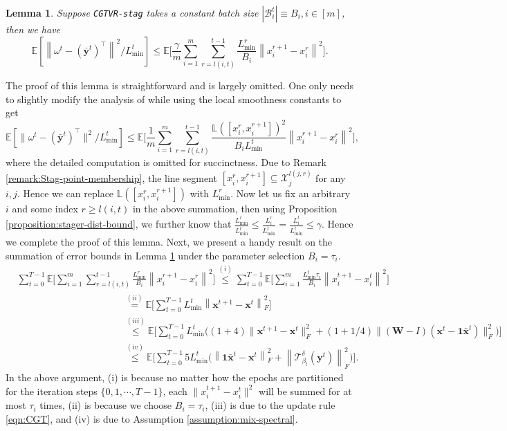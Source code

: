 \documentclass{article}
\newtheorem{lemma}[theorem]{Lemma}
\newcommand{\cX}{\mathcal{X}}
\newcommand{\cB}{\mathcal{B}}
\newcommand{\bL}{\mathbb{L}}
\newcommand{\ctdb}{\mathcal{T}^\delta_{\beta_t}}
\newcommand{\bxt}{\mathbf{x}^t}
\newcommand{\bxte}{\mathbf{x}^{t+1}}
\newcommand{\byt}{\mathbf{y}^t}
\newcommand{\xit}{x_{i}^{t}}
\newcommand{\xite}{x_{i}^{t+1}}
\newcommand{\bbxt}{\bar{\mathbf{x}}^t}
\newcommand{\bbyt}{\bar{\mathbf{y}}^t}
\newcommand{\EE}{\mathbb{E}}
\newcommand{\bW}{\mathbf{W}}
\newcommand{\bone}{\mathbf{1}}
\begin{document}
\begin{lemma}
\label{lemma:bound variance}
Suppose \texttt{CGTVR-stag} takes a constant batch size $|\cB_i^t|\equiv B_i, i\in[m]$, then we have 
\begin{equation}
\label{lm:bound variance-main-1}
\mathbb{E}\left[\left\|\omega^t-(\bbyt)^\top\right\|^2/L_{\min}^t\right]\leq \mathbb{E}\bigg[\frac{\gamma}{m}\sum_{i=1}^m \sum_{r=l(i,t)}^{t-1}\frac{L_{\min}^{r}}{B_i}\left\|x_i^{r+1}-x_i^{r}\right\|^2\bigg].
\end{equation}
\end{lemma}
The proof of this lemma is straightforward and is largely omitted. One only needs to slightly modify the analysis of \cite[Lemma 1, Eq.(39)-(47)]{sun2020improving} while using the local smoothness constants to get 
$$\EE\left[\|\omega^t-(\bbyt)^\top\|^2/L_{\min}^t\right] \leq \mathbb{E}\bigg[\frac{1}{m}\sum_{i=1}^m \sum_{r=l(i,t)}^{t-1}\frac{\bL([x_i^r,x_i^{r+1}])^2}{B_iL_{\min}^t}\left\|x_i^{r+1}-x_i^{r}\right\|^2\bigg],$$
where the detailed computation is omitted for succinctness. Due to Remark \ref{remark:Stag-point-membership}, the line segment $[x_i^r,x_i^{r+1}]\subseteq\cX_j^{l(j,r)}$ for any $i,j$. Hence we can replace $\bL([x_i^r,x_i^{r+1}])$ with $L_{\min}^r$. Now let us fix an arbitrary $i$ and some index $r\geq l(i,t)$ in the above summation, then using Proposition \ref{proposition:stager-dist-bound}, we further know that 
$\frac{L_{\min}^r}{L_{\min}^t}\leq \frac{L_{i}^r}{L_{\min}^t} = \frac{L_{i}^t}{L_{\min}^t} \leq \gamma.$ Hence we complete the proof of this lemma. Next, we present a handy result on the summation of error bounds in Lemma \ref{lemma:bound variance} under the parameter selection $B_i = \tau_i$.
\begin{align}
\label{eqn:summation}
&\sum_{t=0}^{T-1}\mathbb{E}\bigg[\sum_{i=1}^m \sum_{r=l(i,t)}^{t-1}\frac{L_{\min}^{r}}{B_i}\left\|x_i^{r+1}-x_i^{r}\right\|^2\bigg]   \overset{(i)}{\leq}  \sum_{t=0}^{T-1}\mathbb{E}\bigg[\sum_{i=1}^m  \frac{L_{\min}^{t}\tau_i}{B_i}\left\|x_i^{t+1}-x_i^{t}\right\|^2\bigg]\nonumber \\
& \quad\qquad\qquad\qquad\qquad\qquad\overset{(ii)}{=}  \mathbb{E}\bigg[\sum_{t=0}^{T-1}  L_{\min}^{t}\left\|\bxte-\bxt\right\|^2_F\bigg]\\
& \quad\qquad\qquad\qquad\qquad\qquad\overset{(iii)}{\leq}  \mathbb{E}\bigg[\sum_{t=0}^{T-1}  L_{\min}^{t}\Big((1+4)\|\bxte-\bxt\|_F^2 + (1+1/4)\|(\bW-I)(\bxt-\bone\bbxt)\|_F^2\Big)\bigg]\nonumber\\
&\quad\qquad\qquad\qquad\qquad\qquad\overset{(iv)}{\leq} \mathbb{E}\bigg[\sum_{t=0}^{T-1}  5L_{\min}^{t}\Big(\left\|\mathbf{1} \bar{\mathbf{x}}^t-\mathbf{x}^t\right\|^2_F+\left\|\ctdb\left(\byt\right)\right\|^2_F\Big)\bigg].    \nonumber
\end{align} 
In the above argument, (i) is because no matter how the epochs are partitioned for the iteration steps $\{0,1,\cdots,T-1\}$, each $\|\xite-\xit\|^2$ will be summed for at most $\tau_i$ times, (ii) is because we choose $B_i=\tau_i$, (iii) is due to the update rule \eqref{eqn:CGT}, and (iv) is due to Assumption \ref{assumption:mix-spectral}. 
\end{document}
